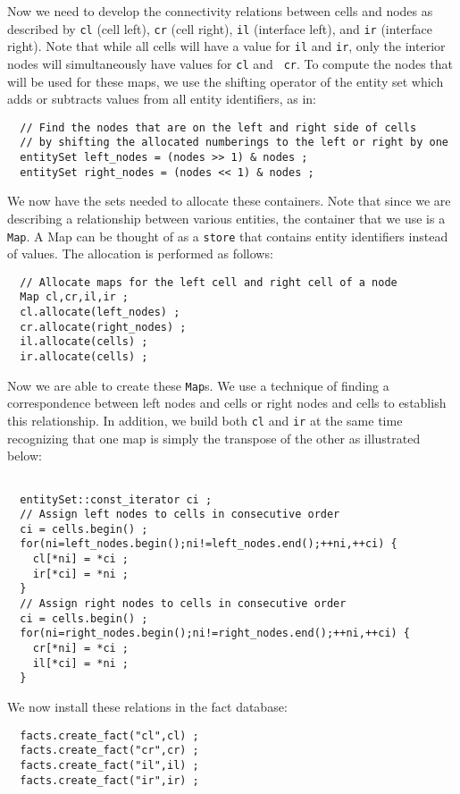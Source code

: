 \documentclass[10pt,epsf,letterpaper,twoside]{book}
\begin{document}
Now we need to develop the connectivity relations between cells and
nodes as described by {\tt cl} (cell left), {\tt cr} (cell right),
{\tt il} (interface left), and {\tt ir} (interface right).  Note that
while all cells will have a value for {\tt il} and {\tt ir}, only the
interior nodes will simultaneously have values for {\tt cl} and {\tt
  cr}.  To compute the nodes that will be used for these maps, we use
the shifting operator of the entity set which adds or subtracts values
from all entity identifiers, as in:
\begin{verbatim}
  // Find the nodes that are on the left and right side of cells
  // by shifting the allocated numberings to the left or right by one
  entitySet left_nodes = (nodes >> 1) & nodes ;
  entitySet right_nodes = (nodes << 1) & nodes ;
\end{verbatim}
We now have the sets needed to allocate these containers.  Note that
since we are describing a relationship between various entities, the
container that we use is a {\tt Map}.  A Map can be thought of as a
{\tt store} that contains entity identifiers instead of values.  The
allocation is performed as follows:
\begin{verbatim}
  // Allocate maps for the left cell and right cell of a node
  Map cl,cr,il,ir ;
  cl.allocate(left_nodes) ;
  cr.allocate(right_nodes) ;
  il.allocate(cells) ;
  ir.allocate(cells) ;
\end{verbatim}
Now we are able to create these {\tt Map}s.  We use a technique of
finding a correspondence between left nodes and cells or right nodes
and cells to establish this relationship.  In addition, we build both
{\tt cl} and {\tt ir} at the same time recognizing that one map is
simply the transpose of the other as illustrated below:
\begin{verbatim}

  entitySet::const_iterator ci ;
  // Assign left nodes to cells in consecutive order
  ci = cells.begin() ;
  for(ni=left_nodes.begin();ni!=left_nodes.end();++ni,++ci) {
    cl[*ni] = *ci ;
    ir[*ci] = *ni ;
  }
  // Assign right nodes to cells in consecutive order
  ci = cells.begin() ;
  for(ni=right_nodes.begin();ni!=right_nodes.end();++ni,++ci) {
    cr[*ni] = *ci ;
    il[*ci] = *ni ;
  }
\end{verbatim}
We now install these relations in the fact database:
\begin{verbatim}
  facts.create_fact("cl",cl) ;
  facts.create_fact("cr",cr) ;
  facts.create_fact("il",il) ;
  facts.create_fact("ir",ir) ;
\end{verbatim}
\end{document}
